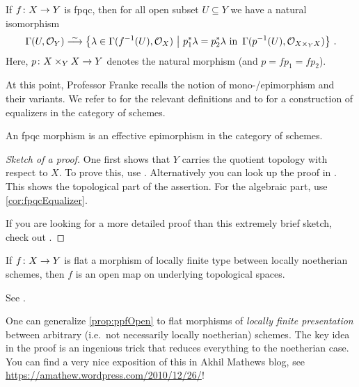 \begin{cor}\label{cor:fpqcEqualizer}
	If $f\colon X\morphism Y$ is fpqc, then for all open subset $U\subseteq Y$ we have a natural isomorphism
	\begin{equation*}
		\Global(U,\Oo_Y)\isomorphism\left\{\lambda\in \Global(f^{-1}(U),\Oo_X)\st p_1^*\lambda =p_2^*\lambda\text{ in }\Global(p^{-1}(U),\Oo_{X\times_YX})\right\}\,.
	\end{equation*}
	Here, $p\colon X\times_YX\morphism Y$ denotes the natural morphism (and $p=fp_1=fp_2$).
\end{cor}
At this point, Professor Franke recalls the notion of mono-/epimorphism and their  variants. We refer to \cite[Appendix~A.1]{alggeo2} for the relevant definitions and to \cite[Subsection~1.3.1]{alggeo1} for a construction of equalizers in the category of schemes.
\begin{prop}\label{prop:fpqcEffectiveEpi}
	An fpqc morphism is an effective epimorphism in the category of schemes.
\end{prop}
\begin{proof}[Sketch of a proof]
	One first shows that $Y$ carries the quotient topology with respect to $X$. To prove this, use \cite[Exposé~VIII Théorème~4.1]{sga1}. Alternatively you can look up the proof in \cite[Proposition~2.5.3]{jacobians}. This shows the topological part of the assertion. For the algebraic part, use \cref{cor:fpqcEqualizer}.
	
	If you are looking for a more detailed proof than this extremely brief sketch, check out \cite[Corollary~2.6.2]{jacobians}.
\end{proof}
\begin{prop}\label{prop:ppfOpen}
	If $f\colon X\morphism Y$ is flat a morphism of locally finite type between locally noetherian schemes, then $f$ is an open map on underlying topological spaces.
\end{prop}
\begin{proof*}
	See \cite[Corollary~2.5.1]{jacobians}.
\end{proof*}
\begin{rem*}\label{rem*:nonNoetherianBaseChange}
	One can generalize \cref{prop:ppfOpen} to flat morphisms of \emph{locally finite presentation} between arbitrary (i.e.\ not necessarily locally noetherian) schemes. The key idea in the proof is an ingenious trick that reduces
	everything to the noetherian case. You can find a very nice exposition of this in Akhil Mathews
	blog, see \url{https://amathew.wordpress.com/2010/12/26/}!
\end{rem*}


